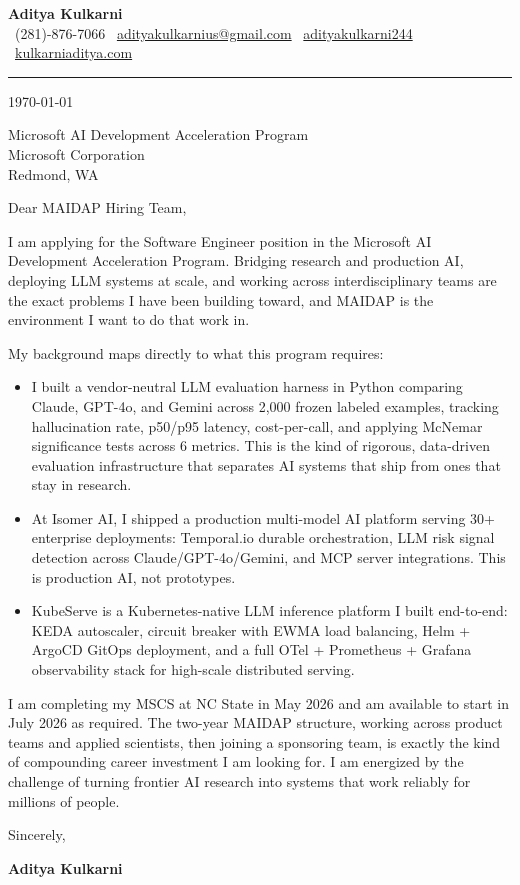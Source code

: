 \documentclass[11pt,a4paper]{article}
\makeatletter
\newcommand{\CLheader}{%
  \begin{center}
    {\Large \textbf{Aditya Kulkarni}}\\[4pt]
    \textcolor{brand}{\faPhone}\ (281)-876-7066 \quad
    \textcolor{brand}{\faEnvelope}\ \href{mailto:adityakulkarnius@gmail.com}{adityakulkarnius@gmail.com} \quad
    \textcolor{brand}{\faLinkedin}\ \href{https://linkedin.com/in/adityakulkarni244}{adityakulkarni244} \quad
    \textcolor{brand}{\faGlobe}\ \href{https://kulkarniaditya.com}{kulkarniaditya.com}
  \end{center}
  \vspace{4pt}
  \textcolor{brand}{\rule{\linewidth}{1.2pt}}
  \vspace{6pt}
}
\makeatother
\begin{document}
\CLheader

\today

\vspace{8pt}

Microsoft AI Development Acceleration Program\\
Microsoft Corporation\\
Redmond, WA

\vspace{8pt}

Dear MAIDAP Hiring Team,

\vspace{6pt}

I am applying for the Software Engineer position in the Microsoft AI Development Acceleration Program. Bridging research and production AI, deploying LLM systems at scale, and working across interdisciplinary teams are the exact problems I have been building toward, and MAIDAP is the environment I want to do that work in.

\vspace{6pt}

My background maps directly to what this program requires:

\vspace{4pt}
\begin{itemize}
  \item[\textcolor{brand}{\faAngleRight}] I built a vendor-neutral LLM evaluation harness in Python comparing Claude, GPT-4o, and Gemini across 2,000 frozen labeled examples, tracking hallucination rate, p50/p95 latency, cost-per-call, and applying McNemar significance tests across 6 metrics. This is the kind of rigorous, data-driven evaluation infrastructure that separates AI systems that ship from ones that stay in research.
  \item[\textcolor{brand}{\faAngleRight}] At Isomer AI, I shipped a production multi-model AI platform serving 30+ enterprise deployments: Temporal.io durable orchestration, LLM risk signal detection across Claude/GPT-4o/Gemini, and MCP server integrations. This is production AI, not prototypes.
  \item[\textcolor{brand}{\faAngleRight}] KubeServe is a Kubernetes-native LLM inference platform I built end-to-end: KEDA autoscaler, circuit breaker with EWMA load balancing, Helm + ArgoCD GitOps deployment, and a full OTel + Prometheus + Grafana observability stack for high-scale distributed serving.
\end{itemize}

\vspace{6pt}

I am completing my MSCS at NC State in May 2026 and am available to start in July 2026 as required. The two-year MAIDAP structure, working across product teams and applied scientists, then joining a sponsoring team, is exactly the kind of compounding career investment I am looking for. I am energized by the challenge of turning frontier AI research into systems that work reliably for millions of people.

\vspace{12pt}

Sincerely,

\vspace{6pt}
\textbf{Aditya Kulkarni}
\end{document}
